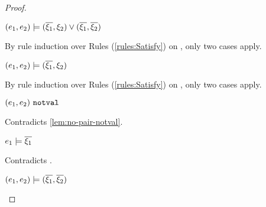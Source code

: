 \begin{proof}
\begin{byCases}
\begin{byCases}
\begin{byCases}
\begin{byCases}
            \item[\text{(\ref{rule:CSOr2})}]
                \begin{pfsteps*}
                \item $(e_1 , e_2) \models (\overline{\xi_1} , \xi_2) \vee (\overline{\xi_1} , \overline{\xi_2})$  
                \end{pfsteps*}
                By rule induction over Rules (\ref{rules:Satisfy}) on , only two cases apply.
                \begin{byCases}
                \item[\text{(\ref{rule:CSOr1})}]
                    \begin{pfsteps*}
                    \item $(e_1 , e_2) \models (\overline{\xi_1} , \xi_2)$  
                    \end{pfsteps*}
                    By rule induction over Rules (\ref{rules:Satisfy}) on , only two cases apply.
                    \begin{byCases}
                    \item[\text{(\ref{rule:CSNotValPair})}]
                        \begin{pfsteps*}
                        \item $(e_1 , e_2) ~\mathtt{notval}$ 
                        \end{pfsteps*}
                        Contradicts \autoref{lem:no-pair-notval}.
                    \item[\text{(\ref{rule:CSPair})}]
                        \begin{pfsteps*}
                        \item $e_1 \models \overline{\xi_1}$ 
                        \end{pfsteps*}
                        Contradicts .
                    \end{byCases}
                \item[\text{(\ref{rule:CSOr2})}]
                    \begin{pfsteps*}
                    \item $(e_1 , e_2) \models (\overline{\xi_1} , \overline{\xi_2})$  

\end{pfsteps*}
\end{byCases}
\end{byCases}
\end{byCases}
\end{byCases}
\end{byCases}
\end{proof}
